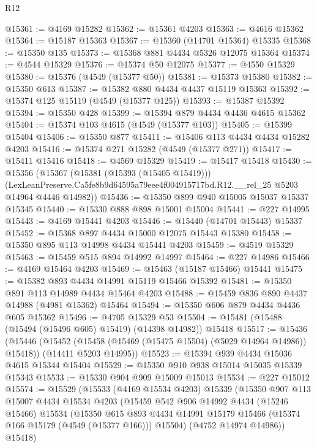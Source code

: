 \begin{lexlean}{R12}
\begin{coremodule}
@15361 := @4169 @15282
@15362 := @15361 @4203
@15363 := @4616 @15362
@15364 := @15187 @15363
@15367 := @15360 (@14701 @15364) @15335
@15368 := @15350 @135
@15373 := @15368 @881 @4434 @5326 @12075 @15364
@15374 := @4544 @15329
@15376 := @15374 @50 @12075
@15377 := @4550 @15329
@15380 := @15376 (@4549 (@15377 @50))
@15381 := @15373 @15380
@15382 := @15350 @613
@15387 := @15382 @880 @4434 @4437 @15119 @15363
@15392 := @15374 @125 @15119 (@4549 (@15377 @125))
@15393 := @15387 @15392
@15394 := @15350 @428
@15399 := @15394 @879 @4434 @4436 @4615 @15362
@15404 := @15374 @103 @4615 (@4549 (@15377 @103))
@15405 := @15399 @15404
@15406 := @15350 @877
@15411 := @15406 @113 @4434 @4434 @15282 @4203
@15416 := @15374 @271 @15282 (@4549 (@15377 @271))
@15417 := @15411 @15416
@15418 := @4569 @15329
@15419 := @15417 @15418
@15430 := @15356
    (@15367
      (@15381 (@15393 (@15405 @15419)))
      (LexLeanPreserve.Ca5fe8b9d64595a79eee4f004915717bd.R12.__rel_25 @5203 @14964 @4446 @14982))
@15436 := @15350 @899 @940 @15005 @15037 @15337 @15345
@15440 := @15330 @888 @898 @15001 @15004
@15441 := @227 @14995
@15443 := @4169 @15441 @4203
@15446 := @15440 (@14701 @15443) @15337
@15452 := @15368 @897 @4434 @15000 @12075 @15443 @15380
@15458 := @15350 @895 @113 @14998 @4434 @15441 @4203
@15459 := @4519 @15329
@15463 := @15459 @515 @894 @14992 @14997
@15464 := @227 @14986
@15466 := @4169 @15464 @4203
@15469 := @15463 (@15187 @15466) @15441
@15475 := @15382 @893 @4434 @14991 @15119 @15466 @15392
@15481 := @15350 @891 @113 @14989 @4434 @15464 @4203
@15488 := @15459 @836 @890 @4437 @14988 (@4981 @15362) @15464
@15494 := @15350 @606 @879 @4434 @4436 @605 @15362
@15496 := @4705 @15329 @53
@15504 := @15481 (@15488 (@15494 (@15496 @605) @15419) (@14398 @14982)) @15418
@15517 := @15436
    (@15446
      (@15452 (@15458 (@15469 (@15475 @15504) (@5029 @14964 @14986)) @15418))
      (@14411 @5203 @14995))
@15523 := @15394 @939 @4434 @15036 @4615 @15344 @15404
@15529 := @15350 @910 @938 @15014 @15035 @15339 @15343
@15533 := @15330 @904 @909 @15009 @15013
@15534 := @227 @15012
@15574 := @15529
    (@15533
      (@4169 @15534 @4203)
      @15339
      (@15350
        @907
        @113
        @15007
        @4434
        @15534
        @4203
        (@15459
          @542
          @906
          @14992
          @4434
          (@15246 @15466)
          @15534
          (@15350
            @615
            @893
            @4434
            @14991
            @15179
            @15466
            (@15374 @166 @15179 (@4549 (@15377 @166)))
            @15504)
          (@4752 @14974 @14986))
        @15418)

\end{coremodule}
\end{lexlean}

